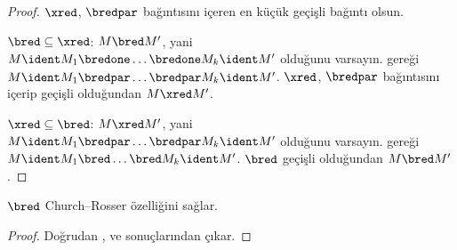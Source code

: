 \documentclass[../../../include/open-logic-section]{subfiles}
\begin{document}
\begin{proof}
  $\xred$, $\bredpar$ bağıntısını içeren en küçük geçişli bağıntı olsun.

  $\bred \subseteq \xred$: $M\bred M'$, yani
  $M\ident M_1\bredone\dots\bredone M_k\ident M'$ olduğunu varsayın.
   gereği
  $M\ident M_1\bredpar\dots\bredpar M_k\ident M'$. $\xred$, $\bredpar$
  bağıntısını içerip geçişli olduğundan $M\xred M'$.

  $\xred \subseteq \bred$: $M\xred M'$, yani
  $M\ident M_1\bredpar\dots\bredpar M_k\ident M'$ olduğunu varsayın.
   gereği
  $M\ident M_1\bred\dots\bred M_k\ident M'$. $\bred$ geçişli olduğundan
  $M\bred M'$.
\end{proof}

\begin{thm}
  $\bred$ Church--Rosser özelliğini sağlar.
\end{thm}

\begin{proof}
  Doğrudan ,  ve 
  sonuçlarından çıkar.
\end{proof}
\end{document}

